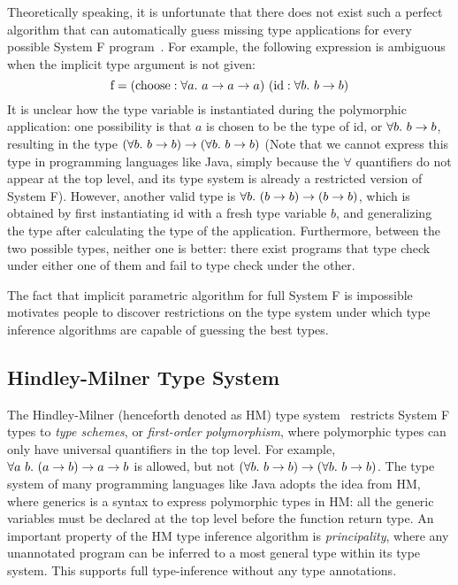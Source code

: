 Theoretically speaking, it is unfortunate that
there does not exist such a perfect algorithm that
can automatically guess missing type applications for every possible
System F program~\citep{tiuryn1996subtyping}.
For example, the following expression is ambiguous
when the implicit type argument is not given:
$$\text{f} = (\text{choose} : \all a \to a \to a)~(\text{id} : \all[b] b \to b)$$
It is unclear how the type variable is instantiated during the polymorphic application:
one possibility is that $a$ is chosen to be the type of $\text{id}$, or $\all[b] b \to b$,
resulting in the type $(\all[b] b \to b) \to (\all[b] b \to b)$
(Note that we cannot express this type in programming languages like Java,
simply because the $\forall$ quantifiers do not appear at the top level,
and its type system is already a restricted version of System F).
However, another valid type is $\all[b] (b \to b) \to (b \to b)$,
which is obtained by first instantiating $\text{id}$ with a fresh type variable $b$,
and generalizing the type after calculating the type of the application.
Furthermore, between the two possible types, neither one is better:
there exist programs that type check under either one of them and
fail to type check under the other.

The fact that implicit parametric algorithm for full System F is impossible
motivates people to discover restrictions on the type system
under which type inference algorithms are capable of guessing the best types.


\subsection{Hindley-Milner Type System}

The Hindley-Milner (henceforth denoted as HM) type system~\citep{hindley1969principal,milner1978theory,damas1982principal} restricts System F types to \emph{type schemes},
or \emph{first-order polymorphism},
where polymorphic types can only have universal quantifiers in the top level.
For example, $\all[a~b] (a \to b) \to a \to b$ is allowed,
but not $(\all[b] b \to b) \to (\all[b] b \to b)$.
The type system of many programming languages like Java adopts the idea from HM,
where generics is a syntax to express polymorphic types in HM:
all the generic variables must be declared
at the top level before the function return type.
An important property of the HM type inference algorithm is \emph{principality},
where any unannotated program can be inferred to
a most general type within its type system.
This supports full type-inference without any type annotations.

